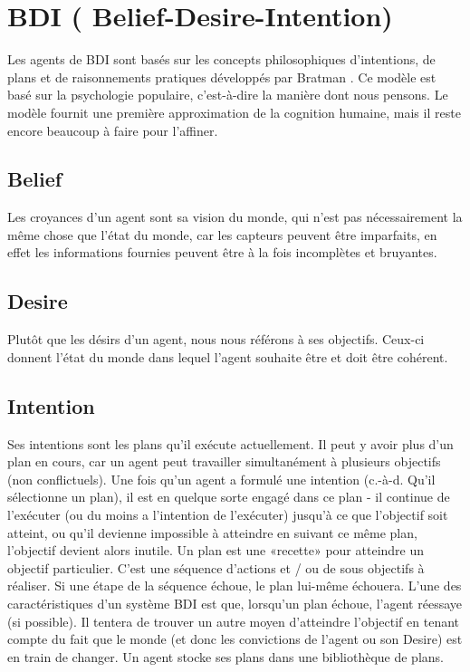 
\chapter{BDI ( Belief-Desire-Intention)} %

\label{Chapter4} %


Les agents de BDI sont basés sur les concepts philosophiques d'intentions, de plans et de raisonnements pratiques développés par Bratman \parencite{bratman1987intention}. Ce modèle est basé sur la psychologie populaire, c'est-à-dire la manière dont nous pensons. Le modèle fournit une première approximation de la cognition humaine, mais il reste encore beaucoup à faire pour l’affiner.


\section{Belief}

Les croyances d'un agent sont sa vision du monde, qui n'est pas nécessairement la même chose que l'état du monde, car les capteurs peuvent être imparfaits, en effet les informations fournies peuvent être à la fois incomplètes et bruyantes.

\section{Desire}

Plutôt que les désirs d’un agent, nous nous référons à ses objectifs. Ceux-ci donnent l'état du monde dans lequel l'agent souhaite être et doit être cohérent.


\section{Intention}

Ses intentions sont les plans qu'il exécute actuellement. Il peut y avoir plus d'un plan en cours, car un agent peut travailler simultanément à plusieurs objectifs (non conflictuels). Une fois qu'un agent a formulé une intention (c.-à-d. Qu'il sélectionne un plan), il est en quelque sorte engagé dans ce plan - il continue de l'exécuter (ou du moins a l'intention de l'exécuter) jusqu'à ce que l'objectif soit atteint, ou qu’il devienne impossible à atteindre en suivant ce même plan, l'objectif devient alors inutile. 
Un plan est une «recette» pour atteindre un objectif particulier. C'est une séquence d'actions et / ou de sous objectifs à réaliser. Si une étape de la séquence échoue, le plan lui-même échouera. L'une des caractéristiques d'un système BDI est que, lorsqu'un plan échoue, l'agent réessaye (si possible). Il tentera de trouver un autre moyen d’atteindre l’objectif en tenant compte du fait que le monde (et donc les convictions de l’agent ou son Desire) est en train de changer. Un agent stocke ses plans dans une bibliothèque de plans.


